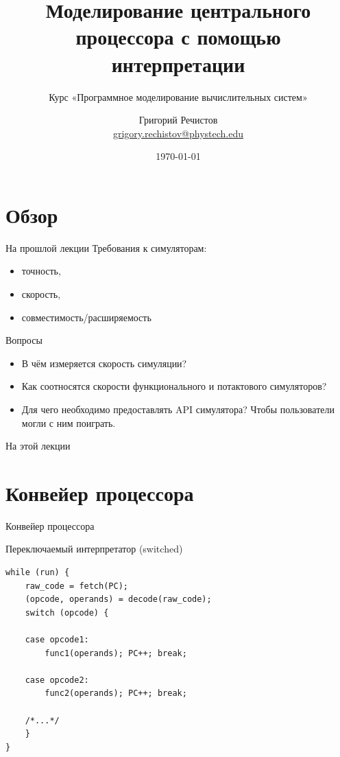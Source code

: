 \documentclass{beamer}
\title{Моделирование центрального процессора с помощью интерпретации}
\subtitle{Курс «Программное моделирование вычислительных систем»}
\author[]{Григорий Речистов \\ \small{\href{mailto:grigory.rechistov@phystech.edu}{grigory.rechistov@phystech.edu}}}
\date{\today}
\begin{document}
\begin{frame}
    \maketitle
\end{frame}

\section*{Обзор}

\begin{frame}{На прошлой лекции}
Требования к симуляторам:
\begin{itemize}
\item точность,
\item скорость,
\item совместимость/расширяемость
\end{itemize}

\end{frame}

\begin{frame}{Вопросы}
\begin{itemize}
\item В чём измеряется скорость симуляции? \pause
\item Как соотносятся скорости функционального и потактового симуляторов? \pause
\item Для чего необходимо предоставлять API симулятора? \pause Чтобы пользователи могли с ним поиграть.
\end{itemize}

\end{frame}

\begin{frame}{На этой лекции}
\tableofcontents
\end{frame} 


\section{Конвейер процессора}

\begin{frame}[shrink=0.8]{Конвейер процессора}
\centering

\end{frame}

\begin{frame}[fragile]{Переключаемый интерпретатор (switched)}
\begin{verbatim}
while (run) {
    raw_code = fetch(PC);
    (opcode, operands) = decode(raw_code);
    switch (opcode) {

    case opcode1:
        func1(operands); PC++; break;

    case opcode2:
        func2(operands); PC++; break;

    /*...*/
    }
}
\end{verbatim}
\end{frame}
\end{document}
